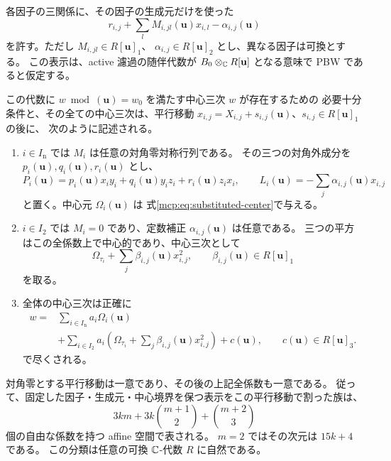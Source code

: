 \begin{theorem}
\label{mcp:thm:normal-form}
各因子の三関係に、その因子の生成元だけを使った
\begin{equation}\label{mcp:eq:general-relations}
       r_{i,j}+\sum_l M_{i,jl}(\mathbf u)x_{i,l}
                         -\alpha_{i,j}(\mathbf u)
\end{equation}
を許す。ただし $M_{i,jl}\in R[\mathbf u]_1$、
$\alpha_{i,j}\in R[\mathbf u]_2$ とし、異なる因子は可換とする。
この表示は、active 濾過の随伴代数が
$B_0\otimes_{\mathbb C}R[\mathbf u]$ となる意味で PBW であると仮定する。

この代数に $w\bmod(\mathbf u)=w_0$ を満たす中心三次 $w$ が存在するための
必要十分条件と、その全ての中心三次は、平行移動
$x_{i,j}=X_{i,j}+s_{i,j}(\mathbf u)$、$s_{i,j}\in R[\mathbf u]_1$ の後に、
次のように記述される。
\begin{enumerate}
 \item $i\in I_{\mathrm n}$ では $M_i$ は任意の対角零対称行列である。
 その三つの対角外成分を $p_i(\mathbf u),q_i(\mathbf u),r_i(\mathbf u)$ とし、
 \[
 P_i(\mathbf u)=p_i(\mathbf u)x_iy_i+q_i(\mathbf u)y_iz_i
                  +r_i(\mathbf u)z_ix_i,\qquad
 L_i(\mathbf u)=-\sum_j\alpha_{i,j}(\mathbf u)x_{i,j}
 \]
 と置く。中心元 $\Omega_i(\mathbf u)$ は
 式\eqref{mcp:eq:substituted-center}で与える。
 \item $i\in I_2$ では $M_i=0$ であり、定数補正 $\alpha_{i,j}(\mathbf u)$ は任意である。
 三つの平方はこの全係数上で中心的であり、中心三次として
 \[
          \Omega_{\tau_i}+\sum_j\beta_{i,j}(\mathbf u)x_{i,j}^2,
             \qquad \beta_{i,j}(\mathbf u)\in R[\mathbf u]_1
 \]
 を取る。
 \item 全体の中心三次は正確に
 \begin{equation}\label{mcp:eq:all-centers}
  \begin{aligned}
  w={}&\sum_{i\in I_{\mathrm n}}a_i\Omega_i(\mathbf u)\\
    &+\sum_{i\in I_2}a_i
      \left(\Omega_{\tau_i}+\sum_j\beta_{i,j}(\mathbf u)x_{i,j}^2\right)
    +c(\mathbf u),\qquad c(\mathbf u)\in R[\mathbf u]_3.
  \end{aligned}
 \end{equation}
 で尽くされる。
\end{enumerate}
対角零とする平行移動は一意であり、その後の上記全係数も一意である。
従って、固定した因子・生成元・中心境界を保つ表示をこの平行移動で割った族は、
\begin{equation}\label{mcp:eq:parameter-count}
          3km+3k\binom{m+1}{2}+\binom{m+2}{3}
\end{equation}
個の自由な係数を持つ affine 空間で表される。
$m=2$ ではその次元は $15k+4$ である。
この分類は任意の可換 $\mathbb C$-代数 $R$ に自然である。
\end{theorem}

